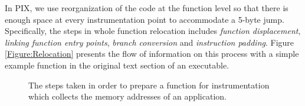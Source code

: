 In PIX, we use reorganization of the code at the function level so that
there is enough space at every instrumentation point to accommodate a 5-byte
jump. Specifically, the steps in whole function relocation includes \textit{function displacement}, \textit{linking function entry points},
\textit{branch conversion} and \textit{instruction padding}. Figure \ref{Figure:Relocation} presents the flow of information on 
this process with a simple example function in the original text section of an executable.

\begin{figure}[ht]
\centering
\caption[Optional caption for list of figures]
{The steps taken in order to prepare a function for instrumentation which collects
the memory addresses of an application.}
\end{figure}
